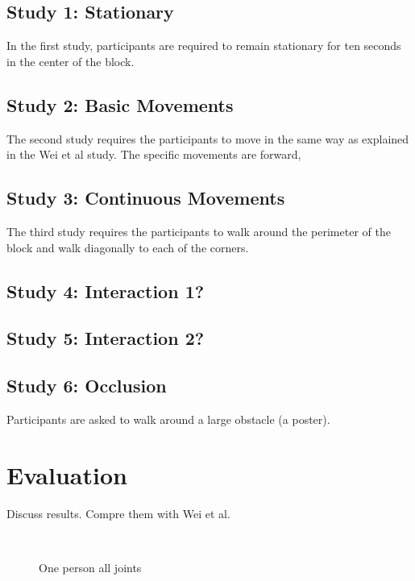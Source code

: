 \documentclass{sigchi}
\begin{document}
\subsection{Study 1: Stationary}

In the first study, participants are required to remain stationary for ten seconds in the center of the block.

\subsection{Study 2: Basic Movements}

The second study requires the participants to move in the same way as explained in the Wei et al study. The specific movements are forward,

\subsection{Study 3: Continuous Movements}

The third study requires the participants to walk around the perimeter of the block and walk diagonally to each of the corners.

\subsection{Study 4: Interaction 1?}

\subsection{Study 5: Interaction 2?}

\subsection{Study 6: Occlusion}

Participants are asked to walk around a large obstacle (a poster).

\section{Evaluation}

Discuss results. Compre them with Wei et al.

\begin{figure}[!h]
  \centering
  
  \caption{One person all joints}~\label{fig:one_person_all}
\end{figure}
\end{document}
